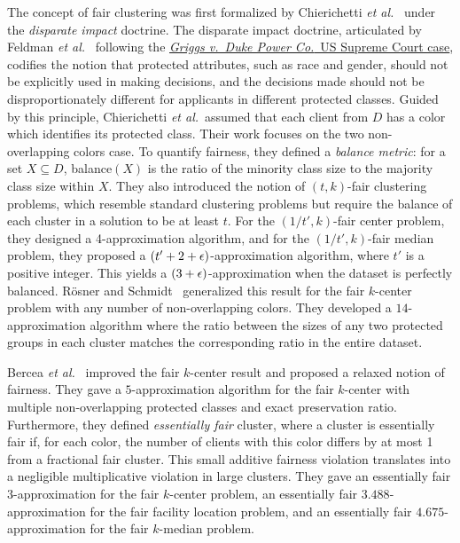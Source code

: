 \documentclass[12pt]{article}
\begin{document}
The concept of fair clustering was first formalized by Chierichetti \emph{et al.}~\cite{CKLV2018} under the \emph{disparate impact} doctrine. 
The disparate impact doctrine, articulated by Feldman \emph{et al.}~\cite{FSMSV2015} following the \href{https://en.wikipedia.org/wiki/Griggs_v._Duke_Power_Co.}{\emph{Griggs v.\ Duke Power Co.}\ US Supreme Court case}, codifies the notion that protected attributes, such as race and gender, should not be explicitly used in making decisions, and the decisions made should not be disproportionately different for applicants in different protected classes. 
Guided by this principle, Chierichetti \emph{et al.}~assumed that each client from $D$ has a color which identifies its protected class. 
Their work focuses on the two non-overlapping colors case. To quantify fairness, they defined a \emph{balance metric}: for a set $X \subseteq D$, balance$(X)$ is the ratio of the minority class size to the majority class size within $X$. 
They also introduced the notion of $(t,k)$-fair clustering problems, which resemble standard clustering problems but require the balance of each cluster in a solution to be at least $t$.
For the $(1/t',k)$-fair center problem, they designed a 4-approximation algorithm, and for the $(1/t',k)$-fair median problem, they proposed a $(t' + 2 + \epsilon)$-approximation algorithm, where $t'$ is a positive integer. 
This yields a $(3 + \epsilon)$-approximation when the dataset is perfectly balanced.
Rösner and Schmidt~\cite{RS2018} generalized this result for the fair $k$-center problem with any number of non-overlapping colors. 
They developed a $14$-approximation algorithm where the ratio between the sizes of any two protected groups in each cluster matches the corresponding ratio in the entire dataset.

Bercea \emph{et al.}~\cite{BGKKRSS2018} improved the fair $k$-center result and proposed a relaxed notion of fairness.
They gave a $5$-approximation algorithm for the fair $k$-center with multiple non-overlapping protected classes and exact preservation ratio. 
Furthermore, they defined \emph{essentially fair} cluster, where a cluster is essentially fair if, for each color, the number of clients with this color differs by at most 1 from a fractional fair cluster. 
This small additive fairness violation translates into a negligible multiplicative violation in large clusters. 
They gave an essentially fair $3$-approximation for the fair $k$-center problem, an essentially fair $3.488$-approximation for the fair facility location problem, and an essentially fair $4.675$-approximation for the fair $k$-median problem.
\end{document}
